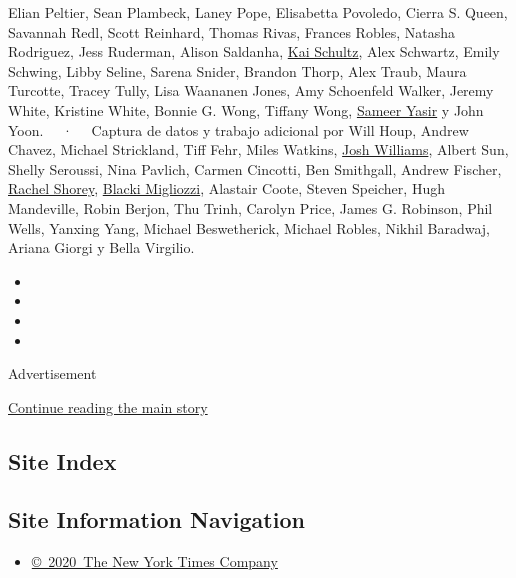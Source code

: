 Elian Peltier, Sean Plambeck, Laney Pope, Elisabetta Povoledo, Cierra S.
Queen, Savannah Redl, Scott Reinhard, Thomas Rivas, Frances Robles,
Natasha Rodriguez, Jess Ruderman, Alison Saldanha,
\href{https://www.nytimes3xbfgragh.onion/by/kai-schultz}{Kai Schultz},
Alex Schwartz, Emily Schwing, Libby Seline, Sarena Snider, Brandon
Thorp, Alex Traub, Maura Turcotte, Tracey Tully, Lisa Waananen Jones,
Amy Schoenfeld Walker, Jeremy White, Kristine White, Bonnie G. Wong,
Tiffany Wong,
\href{https://www.nytimes3xbfgragh.onion/by/sameer-yasir}{Sameer Yasir}
y John Yoon. ~~·~~ Captura de datos y trabajo adicional por Will Houp,
Andrew Chavez, Michael Strickland, Tiff Fehr, Miles Watkins,
\href{https://www.nytimes3xbfgragh.onion/by/josh-williams}{Josh
Williams}, Albert Sun, Shelly Seroussi, Nina Pavlich, Carmen Cincotti,
Ben Smithgall, Andrew Fischer,
\href{https://www.nytimes3xbfgragh.onion/by/rachel-shorey}{Rachel
Shorey},
\href{https://www.nytimes3xbfgragh.onion/by/blacki-migliozzi}{Blacki
Migliozzi}, Alastair Coote, Steven Speicher, Hugh Mandeville, Robin
Berjon, Thu Trinh, Carolyn Price, James G. Robinson, Phil Wells, Yanxing
Yang, Michael Beswetherick, Michael Robles, Nikhil Baradwaj, Ariana
Giorgi y Bella Virgilio.

\begin{itemize}
\item
\item
\item
\item
\end{itemize}

Advertisement

\protect\hyperlink{after-bottom}{Continue reading the main story}

\hypertarget{site-index}{%
\subsection{Site Index}\label{site-index}}

\hypertarget{site-information-navigation}{%
\subsection{Site Information
Navigation}\label{site-information-navigation}}

\begin{itemize}
\tightlist
\item
  \href{https://help.nytimes3xbfgragh.onion/hc/en-us/articles/115014792127-Copyright-notice}{©~2020~The
  New York Times Company}
\end{itemize}

